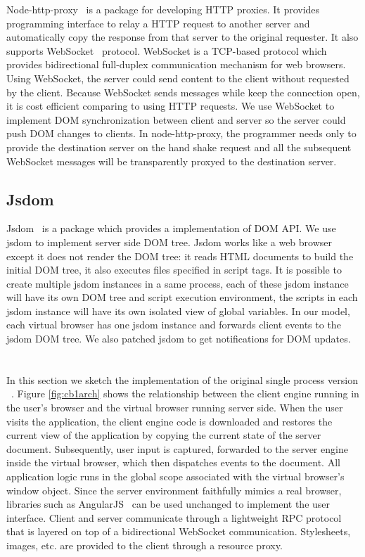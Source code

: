 Node-http-proxy~\cite{nodeproxy} is a \nodejs package for developing HTTP proxies.
It provides programming interface to relay a HTTP request to another server and
automatically copy the response from that server to the original requester.
It also supports WebSocket~\cite{rfc6455} protocol.
WebSocket is a TCP-based protocol which provides bidirectional full-duplex communication
mechanism for web browsers.
Using WebSocket, the server could send content to the client without requested
by the client.
Because WebSocket sends messages while keep the connection open,
it is cost efficient comparing to using HTTP requests.
We use WebSocket to implement DOM synchronization between client and server so
the server could push DOM changes to clients.
In node-http-proxy,
the programmer needs only to provide the destination server on the hand shake
request and all the subsequent WebSocket messages will
be transparently proxyed to the destination server.

\subsection{Jsdom}

Jsdom~\cite{JSDOM} is a \nodejs package which provides a \js implementation of 
DOM API. We use jsdom to implement server side DOM tree.
Jsdom works like a web browser except it does not render the DOM tree:
it reads HTML documents to build the initial DOM tree,
it also executes \js files specified in script tags.
It is possible to create multiple jsdom instances in a same process,
each of these jsdom instance will have its own DOM tree and
script execution environment,
the scripts in each jsdom instance will have its own isolated view of global variables.
In our model, each virtual browser has one jsdom instance and
forwards client events to the jsdom DOM tree.
We also patched jsdom to get notifications for DOM updates.


\section{\cb}

\architectureoverview{}

In this section we sketch the implementation of
the original single process version \cb{}~\cite{mcdaniel2012cloudbrowser}.
Figure \ref{fig:cb1arch} shows the relationship
between the client engine running in the user's browser and the virtual browser
running server side.  When the user visits the application, the client engine
code is downloaded and restores the current view of the application by
copying the current state of the server document.  Subsequently, user input
is captured, forwarded to the server engine inside the virtual browser,
which then dispatches events to the document.  All application logic runs
in the global scope associated with the virtual browser's window object.
Since the server environment faithfully mimics a real browser, libraries
such as AngularJS~\cite{hevery2009angular} can be used unchanged to implement the user interface.
Client and server communicate through a lightweight RPC protocol that is
layered on top of a bidirectional WebSocket communication.
Stylesheets, images, etc. are provided to the client through a resource
proxy.

